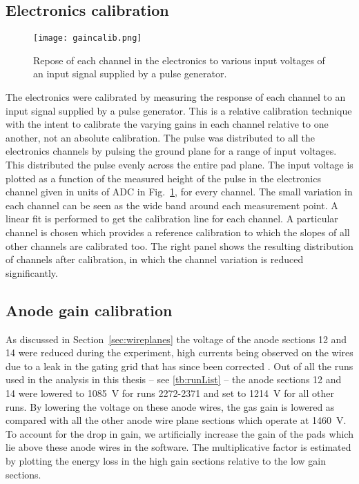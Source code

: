 

\subsection{Electronics calibration}
\label{sec:elecCalib}

\begin{figure}[!htb]
\texttt{[image: gaincalib.png]}
\caption{Repose of each channel in the electronics to various input voltages of an input signal supplied by a pulse generator.}
\label{fig:gaincalib}
\end{figure}

The electronics were calibrated by measuring the response of each channel to an input signal supplied by a pulse generator. This is a relative calibration technique with the intent to calibrate the varying gains in each channel relative to one another, not an absolute calibration. The pulse was distributed to all the electronics channels by pulsing the ground plane for a range of input voltages. This distributed the pulse evenly across the entire pad plane. The input voltage is plotted as a function of the measured height of the pulse in the electronics channel given in units of ADC in Fig.~\ref{fig:gaincalib}, for every channel. The small variation in each channel can be seen as the wide band around each measurement point. A linear fit is performed to get the calibration line for each channel. A particular channel is chosen which provides a reference calibration to which the slopes of all other channels are calibrated too.   The right panel shows the resulting distribution of channels after calibration, in which the channel variation is reduced significantly. 



\subsection{Anode gain calibration}
\label{sec:anodeCalib}
As discussed in Section~\ref{sec:wireplanes} the voltage of the anode sections 12 and 14 were reduced during the experiment, high currents being observed on the wires due to a leak in the gating grid that has since been corrected \cite{jon}. Out of all the runs used in the analysis in this thesis -- see \ref{tb:runList} -- the anode sections 12 and 14 were lowered to \SI{1085}{\volt} for runs 2272-2371 and set to \SI{1214}{\volt} for all other runs. By lowering the voltage on these anode wires, the gas gain is lowered as compared with all the other anode wire plane sections which operate at \SI{1460}{\volt}. To account for the drop in gain, we artificially increase the gain of the pads which lie above these anode wires in the software. The multiplicative factor is estimated by plotting the energy loss in the high gain sections relative to the low gain sections.



